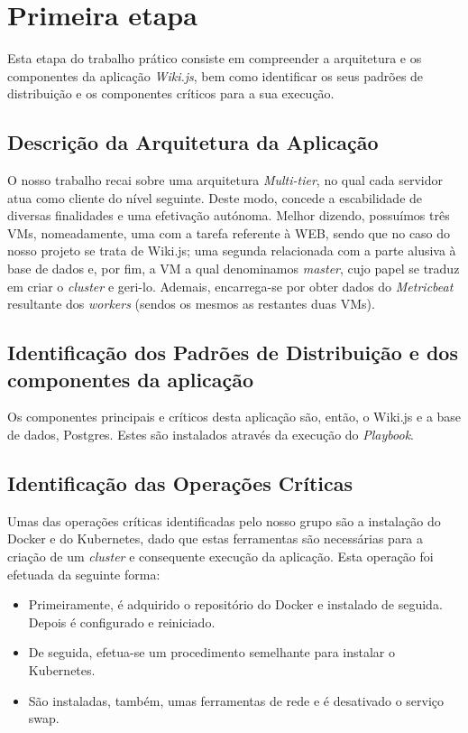 \documentclass[11pt]{article}
\begin{document}
\clearpage
\section{Primeira etapa}

Esta etapa do trabalho prático consiste em compreender a arquitetura e os componentes da aplicação \textit{Wiki.js}, bem como identificar os seus padrões de distribuição e os componentes críticos para a sua execução.

\subsection{Descrição da Arquitetura da Aplicação}

O nosso trabalho recai sobre uma arquitetura \textit{Multi-tier}, no qual cada servidor atua como cliente do nível seguinte. Deste modo, concede a escabilidade de diversas finalidades e uma efetivação autónoma. Melhor dizendo, possuímos três VMs, nomeadamente, uma com a tarefa referente à WEB, sendo que no caso do nosso projeto se trata de Wiki.js;  uma segunda relacionada com a parte alusiva à base de dados e, por fim,  a VM a qual denominamos \textit{master}, cujo papel se traduz em criar o \textit{cluster} e geri-lo. Ademais, encarrega-se por obter dados do \textit{Metricbeat} resultante dos \textit{workers} (sendos os mesmos as restantes duas VMs).

\subsection{Identificação dos Padrões de Distribuição e dos componentes da aplicação}

Os componentes principais e críticos desta aplicação são, então, o Wiki.js e a base de dados, Postgres.
Estes são instalados através da execução do \textit{Playbook}.

\subsection{Identificação das Operações Críticas}

Umas das operações críticas identificadas pelo nosso grupo são a instalação do Docker e do Kubernetes, dado que estas ferramentas são necessárias para a criação de um \textit{cluster} e consequente execução da aplicação. Esta operação foi efetuada da seguinte forma:

\begin{itemize}
    \item Primeiramente, é adquirido o repositório do Docker e instalado de seguida. Depois é configurado e reiniciado.
    
    \item De seguida, efetua-se um procedimento semelhante para instalar o Kubernetes.
    
    \item São instaladas, também, umas ferramentas de rede e é desativado o serviço swap.
\end{itemize}
\end{document}
